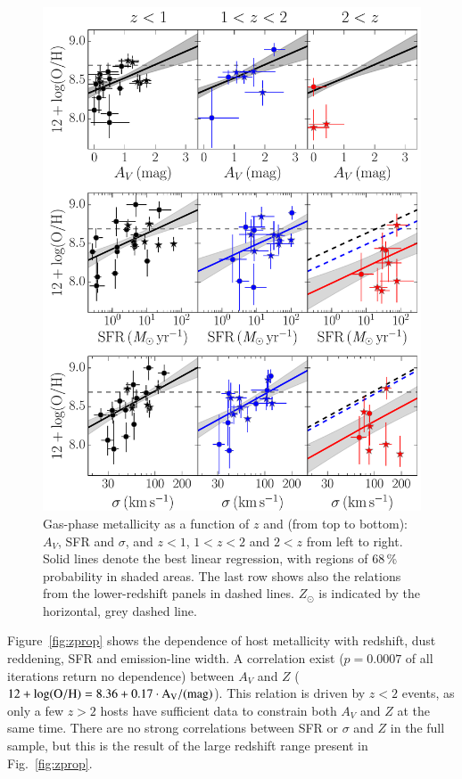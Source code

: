 \documentclass[traditabstract, longauth]{aa}
\newcommand{\oh}{12+\log(\rm{O/H})}
\begin{document}
\begin{figure}
\includegraphics[angle=0, width=0.99\columnwidth]{Figs/Z_z_z.pdf}
\caption{Gas-phase metallicity as a function of $z$ and (from top to bottom): $A_V$, SFR and $\sigma$, and $z < 1$, $1<z<2$ and $2<z$ from left to right. Solid lines denote the best linear regression, with regions of 68\,\% probability in shaded areas. The last row shows also the relations from the lower-redshift panels in dashed lines. $Z_{\odot}$ is indicated by the horizontal, grey dashed line.}
\label{fig:zpropz}
\end{figure}

Figure~\ref{fig:zprop} shows the dependence of host metallicity with redshift, dust reddening, SFR and emission-line width. A correlation exist ($p=0.0007$ of all iterations return no dependence) between $A_V$ and $Z$ ($\oh = 8.36 + 0.17 \cdot A_V/(\rm{mag})$). This relation is driven by $z<2$ events, as only a few $z>2$ hosts have sufficient data to constrain both $A_V$ and $Z$ at the same time. There are no strong correlations between SFR or $\sigma$ and $Z$ in the full sample, but this is the result of the large redshift range present in Fig.~\ref{fig:zprop}.
\end{document}
